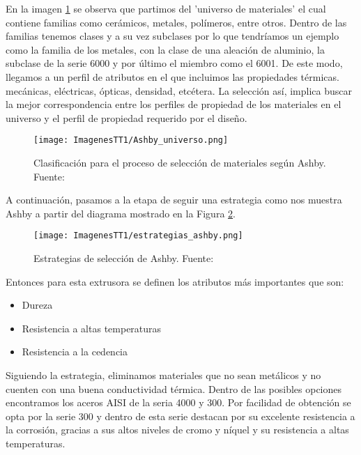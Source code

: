 \documentclass[14pt,oneside]{extarticle} %
\begin{document}
En la imagen \ref{fig:Ashby_universo} se observa que partimos del 'universo de materiales' el cual contiene familias como cerámicos, metales, polímeros, entre otros. Dentro de las familias tenemos clases y a su vez subclases por lo que tendríamos un ejemplo como la familia de los metales, con la clase de una aleación de aluminio, la subclase de la serie 6000 y por último el miembro como el 6001. De este modo, llegamos a un perfil de atributos en el que incluimos las propiedades térmicas. mecánicas, eléctricas, ópticas, densidad, etcétera. La selección así, implica buscar la mejor correspondencia entre los perfiles de propiedad de los materiales en el universo y el perfil de propiedad requerido por el diseño.

\begin{figure}[H]
    \centering
    \texttt{[image: ImagenesTT1/Ashby\_universo.png]}
    \caption{Clasificación para el proceso de selección de materiales según Ashby. Fuente: \cite{Ashby}}
    \label{fig:Ashby_universo}
\end{figure}

\vspace{-1cm}

A continuación, pasamos a la etapa de seguir una estrategia como nos muestra Ashby a partir del diagrama mostrado en la Figura \ref{fig:estrategias_ashby}.

\begin{figure}[H]
    \centering
    \texttt{[image: ImagenesTT1/estrategias\_ashby.png]}
    \caption{Estrategias de selección de Ashby. Fuente: \cite{Ashby}}
    \label{fig:estrategias_ashby}
\end{figure}

Entonces para esta extrusora se definen los atributos más importantes que son:
\begin{itemize}
    \item Dureza
    \item Resistencia a altas temperaturas
    \item Resistencia a la cedencia
\end{itemize}

Siguiendo la estrategia, eliminamos materiales que no sean metálicos y no cuenten con una buena conductividad térmica. Dentro de las posibles opciones encontramos los aceros AISI de la seria 4000 y 300. Por facilidad de obtención se opta por la serie 300 y dentro de esta serie destacan por su excelente resistencia a la corrosión, gracias a sus altos niveles de cromo y níquel y su resistencia a altas temperaturas.
\end{document}
